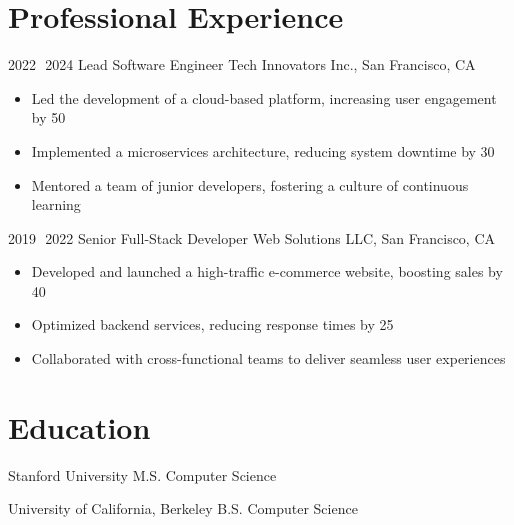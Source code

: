 \documentclass[]{friggeri-cv}
\begin{document}
\section{Professional Experience}
\vspace{-3mm}  
\begin{entrylist}


\entry
{2022\,\textendash\ 2024}
{Lead Software Engineer}
{Tech Innovators Inc., San Francisco, CA}
{
	\vspace{-3mm}
	\begin{itemize}[leftmargin=5mm]
	
		\item Led the development of a cloud-based platform, increasing user engagement by 50%
	
		\item Implemented a microservices architecture, reducing system downtime by 30%
	
		\item Mentored a team of junior developers, fostering a culture of continuous learning
	
	\end{itemize}
}



\entry
{2019\,\textendash\ 2022}
{Senior Full-Stack Developer}
{Web Solutions LLC, San Francisco, CA}
{
	\vspace{-3mm}
	\begin{itemize}[leftmargin=5mm]
	
		\item Developed and launched a high-traffic e-commerce website, boosting sales by 40%
	
		\item Optimized backend services, reducing response times by 25%
	
		\item Collaborated with cross-functional teams to deliver seamless user experiences
	
	\end{itemize}
}


\end{entrylist}

\vspace{-9mm}
\section{Education}

\vspace{-2mm}  
\begin{entrylist}


	\entry
	{Stanford University}
	{M.S. Computer Science}
	{}



	\entry
	{University of California, Berkeley}
	{B.S. Computer Science}
	{}


\end{entrylist}
\end{document}
